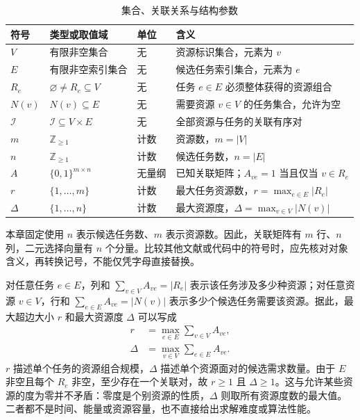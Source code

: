 \begin{table}[htbp]
 \centering
 \caption{集合、关联关系与结构参数}
 \label{s0202:structural_symbols}
 \small
 \begin{tabularx}{\linewidth}{@{}l l l X@{}}
  \toprule
  符号 & 类型或取值域 & 单位 & 含义 \\
  \midrule
  $V$ & 有限非空集合 & 无 & 资源标识集合，元素为 $v$ \\
  $E$ & 有限非空索引集合 & 无 & 候选任务索引集合，元素为 $e$ \\
  $R_e$ & $\varnothing\ne R_e\subseteq V$ & 无 & 任务 $e\in E$ 必须整体获得的资源组合 \\
  $N(v)$ & $N(v)\subseteq E$ & 无 & 需要资源 $v\in V$ 的任务集合，允许为空 \\
  $\mathcal I$ & $\mathcal I\subseteq V\times E$ & 无 & 全部资源与任务的关联有序对 \\
  $m$ & $\mathbb Z_{\geq 1}$ & 计数 & 资源数，$m=|V|$ \\
  $n$ & $\mathbb Z_{\geq 1}$ & 计数 & 候选任务数，$n=|E|$ \\
  $A$ & $\{0,1\}^{m\times n}$ & 无量纲 & 已知关联矩阵；$A_{ve}=1$ 当且仅当 $v\in R_e$ \\
  $r$ & $\{1,\ldots,m\}$ & 计数 & 最大任务资源数，$r=\max_{e\in E}|R_e|$ \\
  $\Delta$ & $\{1,\ldots,n\}$ & 计数 & 最大资源度，$\Delta=\max_{v\in V}|N(v)|$ \\
  \bottomrule
 \end{tabularx}
\end{table}

本章固定使用 $n$ 表示候选任务数、$m$ 表示资源数。因此，关联矩阵有 $m$ 行、$n$ 列，二元选择向量有 $n$ 个分量。比较其他文献或代码中的符号时，应先核对对象含义，再转换记号，不能仅凭字母直接替换。

对任意任务 $e\in E$，列和 $\sum_{v\in V}A_{ve}=|R_e|$ 表示该任务涉及多少种资源；对任意资源 $v\in V$，行和 $\sum_{e\in E}A_{ve}=|N(v)|$ 表示多少个候选任务需要该资源。据此，最大超边大小 $r$ 和最大资源度 $\Delta$ 可以写成
\begin{align}
 r&=\max_{e\in E}\sum_{v\in V}A_{ve},
 \label{s0202:rank}\\
 \Delta&=\max_{v\in V}\sum_{e\in E}A_{ve}.
 \label{s0202:max_degree}
\end{align}
$r$ 描述单个任务的资源组合规模，$\Delta$ 描述单个资源面对的候选需求数量。由于 $E$ 非空且每个 $R_e$ 非空，至少存在一个关联对，故 $r\geq1$ 且 $\Delta\geq1$。这与允许某些资源的度为零并不矛盾：零度是个别资源的性质，$\Delta$ 则取所有资源度数的最大值。二者都不是时间、能量或资源容量，也不直接给出求解难度或算法性能。

